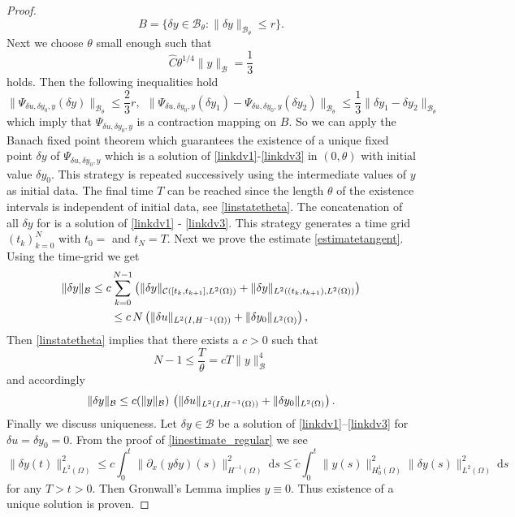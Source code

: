 \begin{proof}
\[
B=\{\delta y \in \mathcal B_{\theta}\colon \|\delta y\|_{\mathcal B_{\theta}}\leq r\}.
\]
Next we choose $\theta$ small enough such that
\begin{equation}\label{linstatetheta}
\hat C\theta^{1/4}\|y\|_{\mathcal B}=\frac{1}{3}
\end{equation}
holds. Then the following inequalities hold
\[
\|\Psi_{\delta u, \delta y_0,y}(\delta y)\|_{\mathcal B_{\theta}}\leq \frac{2}{3}r,~~\|\Psi_{\delta u, \delta y_0,y}(\delta y_1) - \Psi_{\delta u, \delta y_0,y}(\delta y_2)\|_{\mathcal B_{\theta}}\leq\frac{1}{3}\|\delta y_1-\delta y_2\|_{\mathcal B_{\theta}}
\]
which imply that $\Psi_{\delta u, \delta y_0,y}$ is a contraction mapping on $B$. So we can apply the Banach fixed point theorem which guarantees the existence of a unique fixed point $\delta y$ of $\Psi_{\delta u, \delta y_0,y}$ which is a solution of \eqref{linkdv1}-\eqref{linkdv3} in $(0,\theta)$ with initial value $\delta y_0$. This strategy is repeated successively using the intermediate values of $y$ as initial data. The final time $T$ can be reached since the length $\theta$ of the existence intervals is independent of initial data, see \eqref{linstatetheta}. The concatenation of all $\delta y$ for is a solution of \eqref{linkdv1} - \eqref{linkdv3}. This strategy generates a time grid $(t_k)_{k=0}^N$ with $t_0=$ and $t_N=T$. Next we prove the estimate \eqref{estimatetangent}. Using the time-grid we get
\begin{multline*}
\|\delta y\|_{\mathcal B}\leq c\sum_{k=0}^{N-1}\left(\|\delta y\|_{\mathcal C([t_k,t_{k+1}],L^2(\Omega))}+\|\delta y\|_{L^2((t_k,t_{k+1}),L^2(\Omega))}\right)\\
\leq c\,N\left(\|\delta u\|_{\Hm1}+\|\delta y_0\|_{L^2(\Omega)}\right),
\end{multline*}
Then \eqref{linstatetheta} implies that there exists a $c>0$ such that
\[
N-1\leq\frac T\theta=cT\|y\|_{\mathcal B}^4
\]
and accordingly
\[
\|\delta y\|_{\mathcal B}\leq c(\|y\|_{\mathcal B})\,\left(\|\delta u\|_{\Hm1}+\|\delta y_0\|_{L^2(\Omega)}\right).
\]
Finally we discuss uniqueness. Let $\delta y\in \mathcal B$ be a solution of \eqref{linkdv1}--\eqref{linkdv3} for $\delta u=\delta y_0=0$. From the proof of \eqref{linestimate_regular} we see
\[
\|\delta y(t)\|_{L^2(\Omega)}^2\leq c\int_0^t\|\partial_x(y\delta y)(s)\|_{H^{-1}(\Omega)}^2~\mathrm ds\leq \tilde c\int_0^t\|y(s)\|_{H^1_0(\Omega)}^2\|\delta y(s)\|_{L^2(\Omega)}^2~\mathrm ds
\]
for any $T>t>0$. Then Gronwall's Lemma implies $y\equiv0$. Thus existence of a unique solution is proven.


\end{proof}
